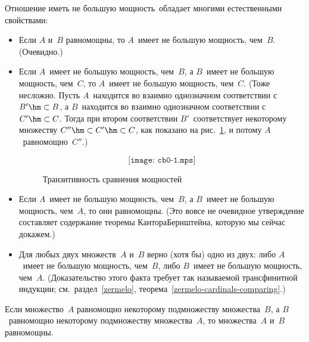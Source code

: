 Отношение  иметь не большую мощность\ обладает многими
естественными свойствами:
\begin{itemize}
\item
Если $A$ и~$B$ равномощны, то $A$~имеет не большую мощность,
чем~$B$. (Очевидно.)
\item
Если $A$~имеет не большую мощность, чем~$B$, а $B$~имеет не большую
мощность, чем~$C$, то $A$~имеет не большую мощность, чем~$C$.
(Тоже несложно. Пусть $A$~находится во взаимно однозначном
соответствии с $B'\hm\subset B$, а $B$~находится во взаимно однозначном
соответствии с $C'\hm\subset C$. Тогда при втором соответствии
$B'$~соответствует некоторому множеству $C''\hm\subset C'\hm\subset C$,
как показано на рис.~\ref{cb-0}, и потому $A$~равномощно~$C''$.)
\begin{figure}[ht]
        $$
\texttt{[image: cb0-1.mps]}
        $$
\caption{Транзитивность сравнения мощностей}
\label{cb-0}
\end{figure}
\item
Если $A$~имеет не большую мощность, чем~$B$, а $B$~имеет не большую
мощность, чем~$A$, то они равномощны. (Это вовсе не очевидное
утверждение составляет содержание теоремы Кантора\ч Бернштейна,
которую мы сейчас докажем.)
\item
Для любых двух множеств~$A$ и~$B$ верно (хотя бы) одно из двух:
либо $A$~имеет не большую мощность, чем~$B$, либо $B$~имеет не
большую мощность, чем~$A$. (Доказательство этого факта требует
так называемой  трансфинитной индукции; см.~раздел~\ref{zermelo},
теорема~\ref{zermelo-cardinals-comparing}.)
\end{itemize}

\begin{theorem}
        \label{cantor-bernstein}
Если множество~$A$ равномощно некоторому подмножеству
множества~$B$, а $B$~равномощно некоторому подмножеству
мно\-жест\-ва~$A$, то множества~$A$ и~$B$ равномощны.
\end{theorem}


